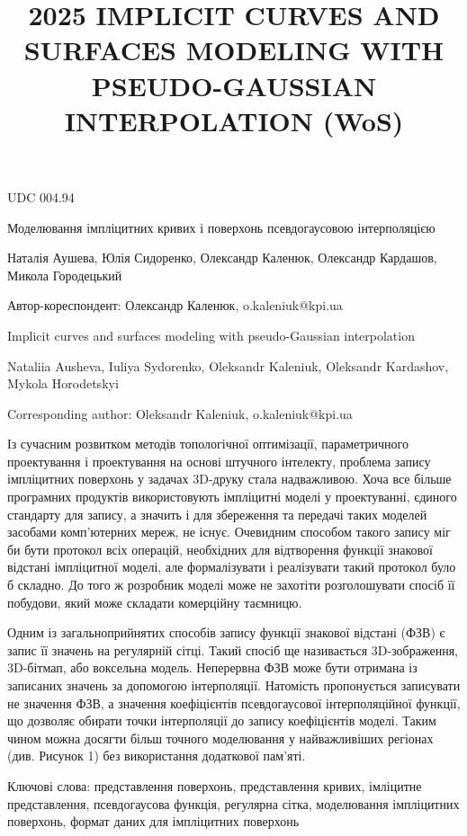 \documentclass[12pt,a4paper]{article}
\begin{document}
\title{2025 IMPLICIT CURVES AND SURFACES MODELING WITH PSEUDO-GAUSSIAN INTERPOLATION (WoS)}
\maketitle
UDC 004.94
\par
Моделювання імпліцитних кривих і поверхонь псевдогаусовою інтерполяцією
\par
Наталія Аушева, Юлія Сидоренко, Олександр Каленюк, Олександр Кардашов, Микола Городецький
\par
Автор-кореспондент: Олександр Каленюк, o.kaleniuk@kpi.ua
\par
Implicit curves and surfaces modeling with pseudo-Gaussian interpolation
\par
Nataliia Ausheva, Iuliya Sydorenko, Oleksandr Kaleniuk, Oleksandr Kardashov, Mykola Horodetskyi
\par
Corresponding author: Oleksandr Kaleniuk, o.kaleniuk@kpi.ua
\par
Із сучасним розвитком методів топологічної оптимізації, параметричного проектування і проектування на основі штучного інтелекту, проблема запису імпліцитних поверхонь у задачах 3D-друку стала надважливою. Хоча все більше програмних продуктів використовують імпліцитні моделі у проектуванні, єдиного стандарту для запису, а значить і для збереження та передачі таких моделей засобами комп’ютерних мереж, не існує. Очевидним способом такого запису міг би бути протокол всіх операцій, необхідних для відтворення функції знакової відстані імпліцитної моделі, але формалізувати і реалізувати такий протокол було б складно. До того ж розробник моделі може не захотіти розголошувати спосіб її побудови, який може складати комерційну таємницю.
\par
Одним із загальноприйнятих способів запису функції знакової відстані (ФЗВ) є запис її значень на регулярній сітці. Такий спосіб ще називається 3D-зображення, 3D-бітмап, або воксельна модель. Неперервна ФЗВ може бути отримана із записаних значень за допомогою інтерполяції. Натомість пропонується записувати не значення ФЗВ, а значення коефіцієнтів псевдогаусової інтерполяційної функції, що дозволяє обирати точки інтерполяції до запису коефіцієнтів моделі. Таким чином можна досягти більш точного моделювання у найважливіших регіонах (див. Рисунок 1) без використання додаткової пам’яті.
\par
Ключові слова: представлення поверхонь, представлення кривих, імліцитне представлення, псевдогаусова функція, регулярна сітка, моделювання імпліцитних поверхонь, формат даних для імпліцитних поверхонь
\end{document}
